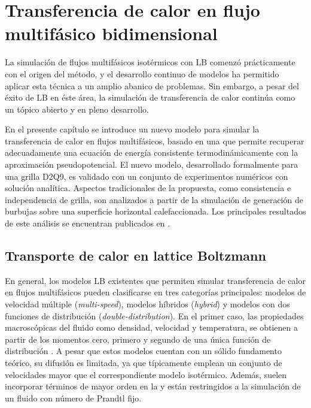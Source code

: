 \chapter{Transferencia de calor en flujo multif\'asico bidimensional}
\label{chap:modelo2D}

La simulaci\'on de flujos multif\'asicos isot\'ermicos con LB comenz\'o pr\'acticamente con el origen del m\'etodo, y el desarrollo continuo de modelos ha permitido aplicar esta t\'ecnica a un amplio abanico de problemas. Sin embargo, a pesar del \'exito de LB en \'este \'area, la simulaci\'on de transferencia de calor contin\'ua como un t\'opico abierto y en pleno desarrollo.

En el presente cap\'itulo se introduce un nuevo modelo para simular la transferencia de calor en flujos multif\'asicos, basado en una \lbe{} que permite recuperar adecuadamente una ecuaci\'on de energ\'ia consistente termodin\'amicamente con la aproximaci\'on pseudopotencial. El nuevo modelo, desarrollado formalmente para una grilla D2Q9, es validado con un conjunto de experimentos num\'ericos con soluci\'on anal\'itica. Aspectos tradicionales de la propuesta, como consistencia e independencia de grilla, son analizados a partir de la simulaci\'on de generaci\'on de burbujas sobre una superficie horizontal calefaccionada. Los principales resultados de este an\'alisis se encuentran publicados en \cite{fogliatto_assessment_2021}.


\section{Transporte de calor en lattice Boltzmann}

En general, los modelos LB existentes que permiten simular transferencia de calor en flujos multif\'asicos pueden clasificarse en tres categor\'ias principales: modelos de velocidad m\'ultiple (\emph{multi-speed}), modelos h\'ibridos (\emph{hybrid}) y modelos con dos funciones de distribuci\'on (\emph{double-distribution}). En el primer caso, las propiedades macrosc\'opicas del fluido como densidad, velocidad y temperatura, se obtienen a partir de los momentos cero, primero y segundo de una \'unica funci\'on de distribuci\'on \cite{succi_lattice_2018,alexander_lattice_1993}. A pesar que estos modelos cuentan con un s\'olido fundamento te\'orico, su difusi\'on es limitada, ya que t\'ipicamente emplean un conjunto de velocidades mayor que el correspondiente modelo isot\'ermico. Adem\'as, suelen incorporar t\'erminos de mayor orden en la \edf{} y est\'an restringidos a la simulaci\'on de un fluido con n\'umero de Prandtl fijo.

